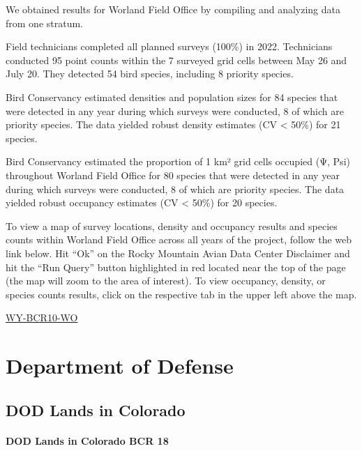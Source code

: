 \documentclass[
  letterpaper,
  DIV=11,
  numbers=noendperiod,
  oneside]{scrreprt}
\begin{document}
We obtained results for Worland Field Office by compiling and analyzing
data from one stratum.

Field technicians completed all planned surveys (100\%) in 2022.
Technicians conducted 95 point counts within the 7 surveyed grid cells
between May 26 and July 20. They detected 54 bird species, including 8
priority species.

Bird Conservancy estimated densities and population sizes for 84 species
that were detected in any year during which surveys were conducted, 8 of
which are priority species. The data yielded robust density estimates
(CV \textless{} 50\%) for 21 species.

Bird Conservancy estimated the proportion of 1 km² grid cells occupied
(Ψ, Psi) throughout Worland Field Office for 80 species that were
detected in any year during which surveys were conducted, 8 of which are
priority species. The data yielded robust occupancy estimates (CV
\textless{} 50\%) for 20 species.

To view a map of survey locations, density and occupancy results and
species counts within Worland Field Office across all years of the
project, follow the web link below. Hit ``Ok'' on the Rocky Mountain
Avian Data Center Disclaimer and hit the ``Run Query'' button
highlighted in red located near the top of the page (the map will zoom
to the area of interest). To view occupancy, density, or species counts
results, click on the respective tab in the upper left above the map.

\href{http://www.rmbo.org/new_site/adc/QueryWindow.aspx\#N4IgzgLgTghhCuBbEAuABCA6gTQLQCEBhAJQEYAGXTAeXX3igFMZ40B7AMzQBkYA7ACZoAsvxgBzRokZ8IaXGkxsoAG35CAYgEtGKodQ4ctAY0YgAvkA}{WY-BCR10-WO}

\hypertarget{department-of-defense}{%
\chapter{Department of Defense}\label{department-of-defense}}

\hypertarget{dod-lands-in-colorado}{%
\section{DOD Lands in Colorado}\label{dod-lands-in-colorado}}

\hypertarget{dod-lands-in-colorado-bcr-18}{%
\subsubsection{DOD Lands in Colorado BCR
18}\label{dod-lands-in-colorado-bcr-18}}
\end{document}
